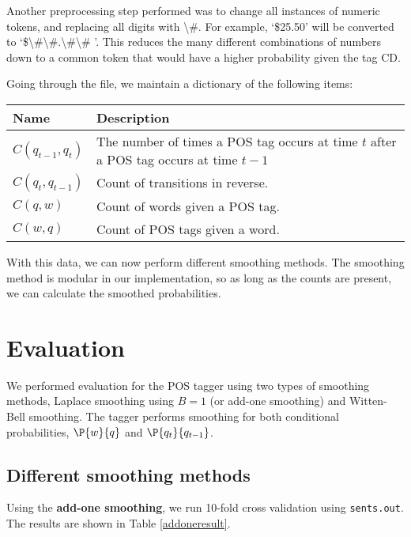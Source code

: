 \documentclass[12pt]{homework}
\begin{document}
Another preprocessing step performed was to change all instances of numeric 
tokens, and replacing all digits with \textbackslash\#. For example, `\$25.50' 
will be converted to 
`\$\textbackslash\#\textbackslash\#.\textbackslash\#\textbackslash\# '. This 
reduces the many different combinations of numbers down to a common token that 
would have a higher probability given the tag CD.

Going through the file, we maintain a dictionary of the following items:
\begin{center}
	\begin{tabular}{l p{10cm}}
	\hline
	Name	&	Description\\
	\hline
	$C(q_{t-1},q_t)$	& The number of times a POS tag occurs at time $t$ 
	after a POS tag occurs at time $t-1$ \\
	$C(q_t,q_{t-1})$	& Count of transitions in reverse. \\
	$C(q,w)$	& Count of words given a POS tag. \\
	$C(w,q)$	& Count of POS tags given a word.\\
	\hline
\end{tabular}
\end{center}
With this data, we can now perform different smoothing methods. The smoothing 
method is modular in our implementation, so as long as the counts are present, 
we can calculate the smoothed probabilities.

\section{Evaluation}
We performed evaluation for the POS tagger using two types of smoothing methods, 
Laplace smoothing using $B=1$ (or add-one smoothing) and Witten-Bell smoothing.  
The tagger performs smoothing for both conditional probabilities, $\P{w}{q}$ and 
$\P{q_t}{q_{t-1}}$.

\subsection{Different smoothing methods}
Using the \textbf{add-one smoothing}, we run 10-fold cross validation using
\texttt{sents.out}. The results are shown in Table \ref{addoneresult}.
\end{document}
